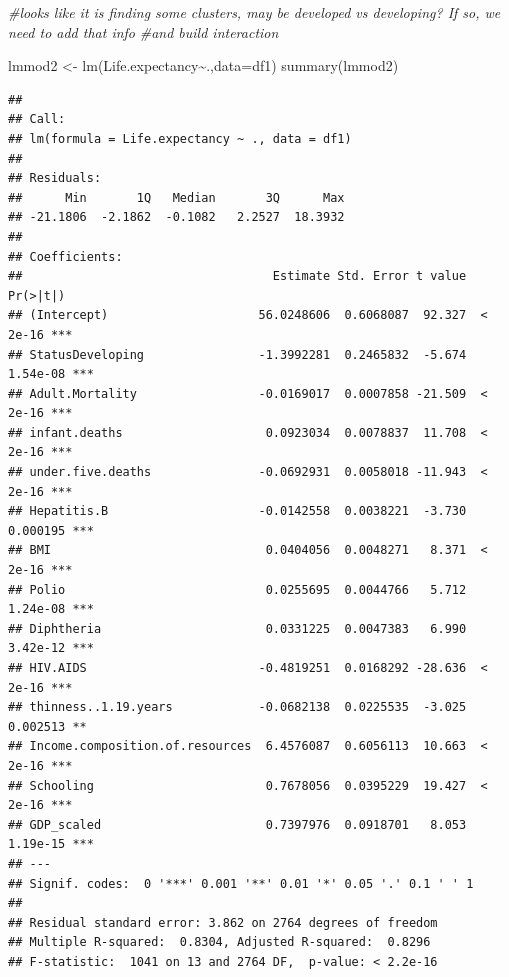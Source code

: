 \documentclass[
]{article}
\newenvironment{Shaded}{\begin{snugshade}}{\end{snugshade}}
\newcommand{\AttributeTok}[1]{\textcolor[rgb]{0.77,0.63,0.00}{#1}}
\newcommand{\CommentTok}[1]{\textcolor[rgb]{0.56,0.35,0.01}{\textit{#1}}}
\newcommand{\FunctionTok}[1]{\textcolor[rgb]{0.00,0.00,0.00}{#1}}
\newcommand{\NormalTok}[1]{#1}
\newcommand{\OtherTok}[1]{\textcolor[rgb]{0.56,0.35,0.01}{#1}}
\newcommand{\SpecialCharTok}[1]{\textcolor[rgb]{0.00,0.00,0.00}{#1}}
\begin{document}
\begin{Shaded}
\begin{Highlighting}[]
\CommentTok{\#looks like it is finding some clusters, may be developed vs developing? If so, we need to add that info }
\CommentTok{\#and build interaction}
\end{Highlighting}
\end{Shaded}

\begin{Shaded}
\begin{Highlighting}[]
\NormalTok{lmmod2 }\OtherTok{\textless{}{-}} \FunctionTok{lm}\NormalTok{(Life.expectancy}\SpecialCharTok{\textasciitilde{}}\NormalTok{.,}\AttributeTok{data=}\NormalTok{df1)}
\FunctionTok{summary}\NormalTok{(lmmod2)}
\end{Highlighting}
\end{Shaded}

\begin{verbatim}
## 
## Call:
## lm(formula = Life.expectancy ~ ., data = df1)
## 
## Residuals:
##      Min       1Q   Median       3Q      Max 
## -21.1806  -2.1862  -0.1082   2.2527  18.3932 
## 
## Coefficients:
##                                   Estimate Std. Error t value Pr(>|t|)    
## (Intercept)                     56.0248606  0.6068087  92.327  < 2e-16 ***
## StatusDeveloping                -1.3992281  0.2465832  -5.674 1.54e-08 ***
## Adult.Mortality                 -0.0169017  0.0007858 -21.509  < 2e-16 ***
## infant.deaths                    0.0923034  0.0078837  11.708  < 2e-16 ***
## under.five.deaths               -0.0692931  0.0058018 -11.943  < 2e-16 ***
## Hepatitis.B                     -0.0142558  0.0038221  -3.730 0.000195 ***
## BMI                              0.0404056  0.0048271   8.371  < 2e-16 ***
## Polio                            0.0255695  0.0044766   5.712 1.24e-08 ***
## Diphtheria                       0.0331225  0.0047383   6.990 3.42e-12 ***
## HIV.AIDS                        -0.4819251  0.0168292 -28.636  < 2e-16 ***
## thinness..1.19.years            -0.0682138  0.0225535  -3.025 0.002513 ** 
## Income.composition.of.resources  6.4576087  0.6056113  10.663  < 2e-16 ***
## Schooling                        0.7678056  0.0395229  19.427  < 2e-16 ***
## GDP_scaled                       0.7397976  0.0918701   8.053 1.19e-15 ***
## ---
## Signif. codes:  0 '***' 0.001 '**' 0.01 '*' 0.05 '.' 0.1 ' ' 1
## 
## Residual standard error: 3.862 on 2764 degrees of freedom
## Multiple R-squared:  0.8304, Adjusted R-squared:  0.8296 
## F-statistic:  1041 on 13 and 2764 DF,  p-value: < 2.2e-16
\end{verbatim}
\end{document}

